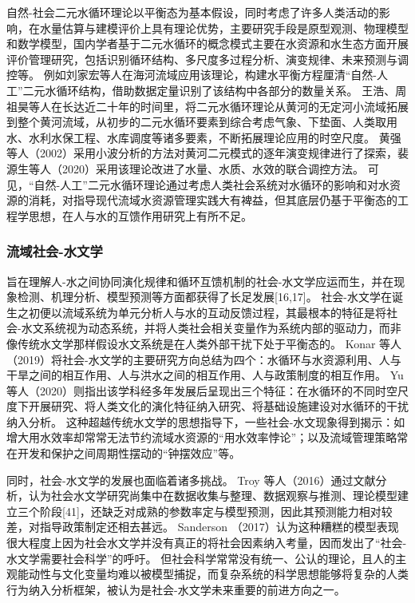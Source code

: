 % 
自然-社会二元水循环理论以平衡态为基本假设，同时考虑了许多人类活动的影响，在水量估算与建模评价上具有理论优势，主要研究手段是原型观测、物理模型和数学模型，国内学者基于二元水循环的概念模式主要在水资源和水生态方面开展评价管理研究，包括识别循环结构、多尺度多过程分析、演变规律、未来预测与调控等\cite{wang2016}。
例如刘家宏等人在海河流域应用该理论，构建水平衡方程厘清“自然-人工”二元水循环结构，借助数据定量识别了该结构中各部分的数量关系\cite{liu2010}。
王浩\cite{wang2004}、周祖昊\cite{zhou2022a}等人在长达近二十年的时间里，将二元水循环理论从黄河的无定河小流域拓展到整个黄河流域，从初步的二元水循环要素到综合考虑气象、下垫面、人类取用水、水利水保工程、水库调度等诸多要素，不断拓展理论应用的时空尺度。
黄强等人（2002）采用小波分析的方法对黄河二元模式的逐年演变规律进行了探索\cite{huang2002}，裴源生等人（2020）采用该理论改进了水量、水质、水效的联合调控方法\cite{pei2020}。
可见，“自然-人工”二元水循环理论通过考虑人类社会系统对水循环的影响和对水资源的消耗，对指导现代流域水资源管理实践大有裨益，但其底层仍基于平衡态的工程学思想，在人与水的互馈作用研究上有所不足。

\subsubsection*{流域社会-水文学}

旨在理解人-水之间协同演化规律和循环互馈机制的社会-水文学应运而生，并在现象检测、机理分析、模型预测等方面都获得了长足发展[16,17]。
社会-水文学在诞生之初便以流域系统为单元分析人与水的互动反馈过程，其最根本的特征是将社会-水文系统视为动态系统，并将人类社会相关变量作为系统内部的驱动力，而非像传统水文学那样假设水文系统是在人类外部干扰下处于平衡态的\cite{sivapalan2012}。
Konar 等人（2019）将社会-水文学的主要研究方向总结为四个：水循环与水资源利用、人与干旱之间的相互作用、人与洪水之间的相互作用、人与政策制度的相互作用\cite{konar2019}。
Yu 等人（2020）则指出该学科经多年发展后呈现出三个特征：在水循环的不同时空尺度下开展研究、将人类文化的演化特征纳入研究、将基础设施建设对水循环的干扰纳入分析\cite{yu2020}。
这种超越传统水文学的思想指导下，一些社会-水文现象得到揭示：如增大用水效率却常常无法节约流域水资源的“用水效率悖论”；以及流域管理策略常在开发和保护之间周期性摆动的“钟摆效应”等。 %

同时，社会-水文学的发展也面临着诸多挑战。
Troy 等人（2016）通过文献分析，认为社会水文学研究尚集中在数据收集与整理、数据观察与推测、理论模型建立三个阶段[41]，还缺乏对成熟的参数率定与模型预测，因此其预测能力相对较差，对指导政策制定还相去甚远。  %
Sanderson （2017）\cite{sanderson2017}认为这种糟糕的模型表现很大程度上因为社会水文学并没有真正的将社会因素纳入考量，因而发出了“社会-水文学需要社会科学”的呼吁。
但社会科学常常没有统一、公认的理论，且人的主观能动性与文化变量均难以被模型捕捉，而复杂系统的科学思想能够将复杂的人类行为纳入分析框架，被认为是社会-水文学未来重要的前进方向之一\cite{ahlstrom2021}。

